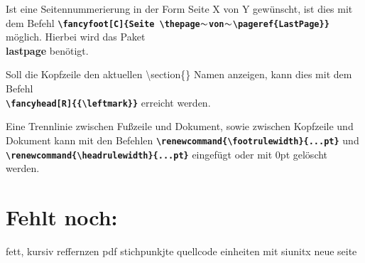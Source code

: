 Ist eine Seitennummerierung in der Form Seite X von Y gewünscht, ist dies mit dem Befehl \textbf{\texttt{\textbackslash fancyfoot[C]\{Seite \textbackslash thepage$\thicksim$von$\thicksim$\textbackslash pageref\{LastPage\}\}}} möglich. Hierbei wird das Paket \\ \textbf{lastpage} benötigt.

Soll die Kopfzeile den aktuellen \textbackslash section\{\} Namen anzeigen, kann dies mit dem Befehl \\ \textbf{\texttt{\textbackslash fancyhead[R]\{\{\textbackslash leftmark\}\}}} erreicht werden.

Eine Trennlinie zwischen Fußzeile und Dokument, sowie zwischen Kopfzeile und Dokument kann mit den Befehlen \textbf{\texttt{\textbackslash renewcommand\{\textbackslash footrulewidth\}\{...pt\}}} und \textbf{\texttt{\textbackslash renewcommand\{\textbackslash headrulewidth\}\{...pt\}}} eingefügt oder mit 0pt gelöscht werden.



\newpage

\section{Fehlt noch:}


fett, kursiv
reffernzen
%
pdf
stichpunkjte
quellcode
einheiten mit siunitx
neue seite
